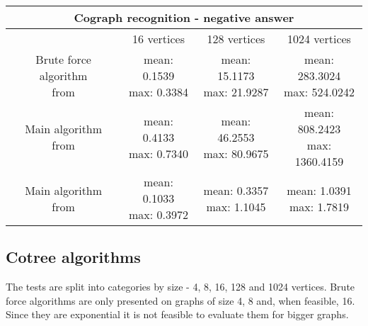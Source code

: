 \begin{center}

    \begin{tabular}{ |c|c|c|c|}
        \hline
        \multicolumn{4}{|c|}{Cograph recognition - negative answer} \\
        \hline
         & 16 vertices & 128 vertices & 1024 vertices               \\
        \hline
        \makecell{Brute force algorithm                             \\ from \cite{habib}} & \makecell{mean: 0.1539                                \\ max: 0.3384} & \makecell{mean: 15.1173 \\ max: 21.9287} & \makecell{mean: 283.3024 \\ max: 524.0242} \\
        \hline
        \makecell{Main algorithm                                    \\ from \cite{habib}} & \makecell{mean: 0.4133                                 \\ max: 0.7340} & \makecell{mean: 46.2553 \\ max: 80.9675} & \makecell{mean: 808.2423 \\ max: 1360.4159} \\
        \hline
        \makecell{Main algorithm                                    \\ from \cite{corneil}} & \makecell{mean:  0.1033                                 \\ max: 0.3972} & \makecell{mean: 0.3357  \\ max: 1.1045} & \makecell{mean:  1.0391  \\ max: 1.7819} \\
        \hline
    \end{tabular}
\end{center}

\subsection{Cotree algorithms}

The tests are split into categories by size - 4, 8, 16, 128 and 1024  vertices. Brute force algorithms are only presented on graphs of size 4, 8 and, when feasible, 16. Since they are exponential it is not feasible to evaluate them for bigger graphs.

